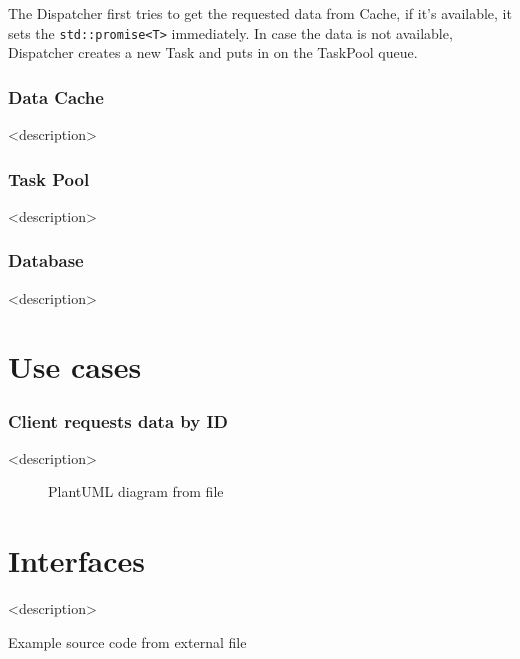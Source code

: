 \documentclass[table]{article}
\begin{document}
The Dispatcher first tries to get the requested data from Cache, if it's available, it sets the
\texttt{std::promise<T>} immediately. In case the data is not available, Dispatcher creates a new
Task and puts in on the TaskPool queue.

\subsubsection{Data Cache}

<description>

\subsubsection{Task Pool}

<description>

\subsubsection{Database}

<description>



%
%
\pagebreak
\section{Use cases}

\subsubsection{Client requests data by ID}

<description>

\begin{figure}[ht]
    \centering
    
    \caption{PlantUML diagram from file}
    \label{fig:client_requests_data}
\end{figure}




%
%
\pagebreak
\section{Interfaces}

<description>

\begin{listing}[ht]
    \caption{Example source code from external file}
    \label{lst:hello_world}
\end{listing}
\end{document}
